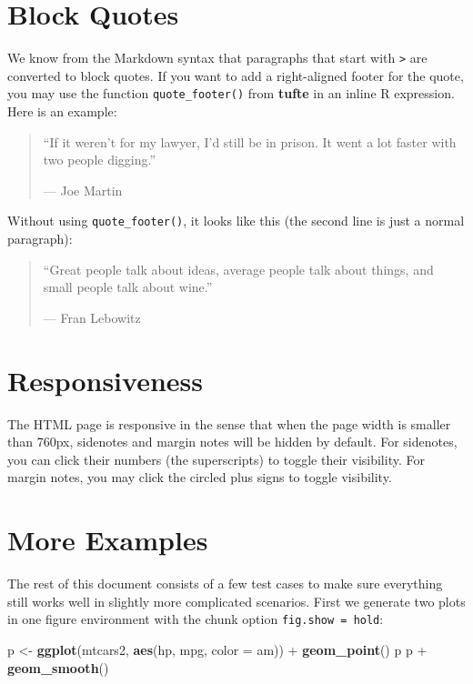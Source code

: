 \documentclass[]{tufte-handout}
\newenvironment{Shaded}{}{}
\newcommand{\KeywordTok}[1]{\textcolor[rgb]{0.00,0.44,0.13}{\textbf{{#1}}}}
\newcommand{\DataTypeTok}[1]{\textcolor[rgb]{0.56,0.13,0.00}{{#1}}}
\newcommand{\StringTok}[1]{\textcolor[rgb]{0.25,0.44,0.63}{{#1}}}
\newcommand{\NormalTok}[1]{{#1}}
\begin{document}
\section{Block Quotes}\label{block-quotes}

We know from the Markdown syntax that paragraphs that start with
\texttt{\textgreater{}} are converted to block quotes. If you want to
add a right-aligned footer for the quote, you may use the function
\texttt{quote\_footer()} from \textbf{tufte} in an inline R expression.
Here is an example:

\begin{quote}
``If it weren't for my lawyer, I'd still be in prison. It went a lot
faster with two people digging.''

\hfill --- Joe Martin
\end{quote}

Without using \texttt{quote\_footer()}, it looks like this (the second
line is just a normal paragraph):

\begin{quote}
``Great people talk about ideas, average people talk about things, and
small people talk about wine.''

--- Fran Lebowitz
\end{quote}

\section{Responsiveness}\label{responsiveness}

The HTML page is responsive in the sense that when the page width is
smaller than 760px, sidenotes and margin notes will be hidden by
default. For sidenotes, you can click their numbers (the superscripts)
to toggle their visibility. For margin notes, you may click the circled
plus signs to toggle visibility.

\section{More Examples}\label{more-examples}

The rest of this document consists of a few test cases to make sure
everything still works well in slightly more complicated scenarios.
First we generate two plots in one figure environment with the chunk
option \texttt{fig.show = \textquotesingle{}hold\textquotesingle{}}:

\begin{Shaded}
\begin{Highlighting}[]
\NormalTok{p <-}\StringTok{ }\KeywordTok{ggplot}\NormalTok{(mtcars2, }\KeywordTok{aes}\NormalTok{(hp, mpg, }\DataTypeTok{color =} \NormalTok{am)) +}
\StringTok{  }\KeywordTok{geom_point}\NormalTok{()}
\NormalTok{p}
\NormalTok{p +}\StringTok{ }\KeywordTok{geom_smooth}\NormalTok{()}
\end{Highlighting}
\end{Shaded}
\end{document}
